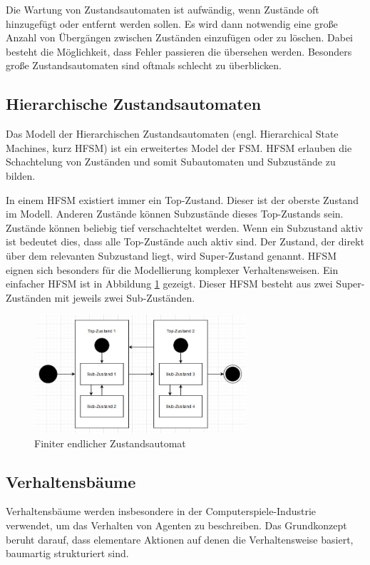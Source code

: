 Die Wartung von Zustandsautomaten ist aufwändig, wenn Zustände oft hinzugefügt oder entfernt werden sollen. Es wird dann notwendig eine große Anzahl von Übergängen zwischen Zuständen einzufügen oder zu löschen. Dabei besteht die Möglichkeit, dass Fehler passieren die übersehen werden. Besonders große Zustandsautomaten sind oftmals schlecht zu überblicken. 

\subsection{Hierarchische Zustandsautomaten}
Das Modell der Hierarchischen Zustandsautomaten (engl. Hierarchical State Machines, kurz HFSM) ist ein erweitertes Model der FSM. HFSM erlauben die Schachtelung von Zuständen und somit Subautomaten und Subzustände zu bilden.  

In einem HFSM existiert immer ein Top-Zustand. Dieser ist der oberste Zustand im Modell. Anderen Zustände können Subzustände dieses Top-Zustands sein. Zustände können beliebig tief verschachteltet werden. Wenn ein Subzustand aktiv ist bedeutet dies, dass alle Top-Zustände auch aktiv sind. Der Zustand, der direkt über dem relevanten Subzustand liegt, wird Super-Zustand genannt. 
HFSM eignen sich besonders für die Modellierung komplexer Verhaltensweisen. Ein einfacher HFSM ist in Abbildung \ref{HFS:PLC} gezeigt. Dieser HFSM besteht aus zwei Super-Zuständen mit jeweils zwei Sub-Zuständen.
\FloatBarrier
\begin{figure}[h]
  \centering
  \includegraphics[width=0.7\textwidth]{images/stand_der_technik/HFSM_Plazebo.JPG}
  \caption[Finiter endlicher Zustandsautomat]{Finiter endlicher Zustandsautomat}
  \label{HFS:PLC}
\end{figure}
\FloatBarrier

\subsection{Verhaltensbäume}
Verhaltensbäume werden insbesondere in der Computerspiele-Industrie verwendet, um das Verhalten von Agenten zu beschreiben. Das Grundkonzept beruht darauf, dass elementare Aktionen auf denen die Verhaltensweise basiert, baumartig strukturiert sind.

